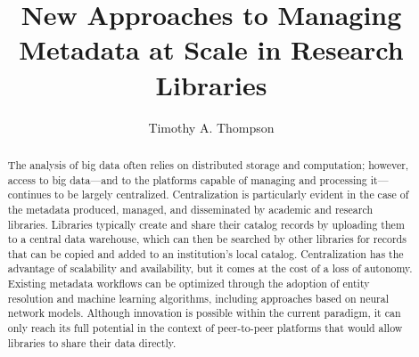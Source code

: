 \documentclass[sigconf]{acmart}
\begin{document}
\title{New Approaches to Managing Metadata at Scale in Research Libraries}
\author{Timothy A. Thompson}

\begin{abstract} 
The analysis of big data often relies on distributed storage and computation; however, access to big data---and to the platforms capable of managing and processing it---continues to be largely centralized. Centralization is particularly evident in the case of the metadata produced, managed, and disseminated by academic and research libraries. Libraries typically create and share their catalog records by uploading them to a central data warehouse, which can then be searched by other libraries for records that can be copied and added to an institution's local catalog. Centralization has the advantage of scalability and availability, but it comes at the cost of a loss of autonomy. Existing metadata workflows can be optimized through the adoption of entity resolution and machine learning algorithms, including approaches based on neural network models. Although innovation is possible within the current paradigm, it can only reach its full potential in the context of peer-to-peer platforms that would allow libraries to share their data directly.
\end{abstract}


\maketitle
\end{document}
